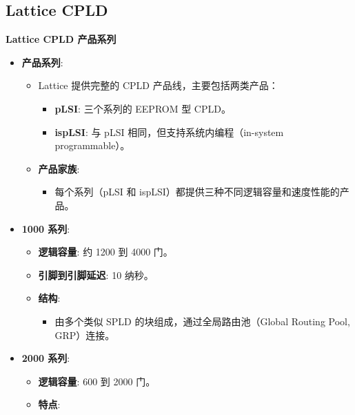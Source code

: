 \subsection{Lattice CPLD}
\begin{frame}[allowframebreaks]{\textbf{Lattice CPLD 产品系列}}
\begin{itemize}
\tightlist
\item
    \textbf{产品系列}:

    \begin{itemize}
    \tightlist
    \item
    Lattice 提供完整的 CPLD 产品线，主要包括两类产品：

    \begin{itemize}
    \tightlist
    \item
        \textbf{pLSI}: 三个系列的 EEPROM 型 CPLD。
    \item
        \textbf{ispLSI}: 与 pLSI 相同，但支持系统内编程（in-system
        programmable）。
    \end{itemize}
    \item
    \textbf{产品家族}:

    \begin{itemize}
    \tightlist
    \item
        每个系列（pLSI 和 ispLSI）都提供三种不同逻辑容量和速度性能的产品。
    \end{itemize}
    \end{itemize}
\item
    \textbf{1000 系列}:

    \begin{itemize}
    \tightlist
    \item
    \textbf{逻辑容量}: 约 1200 到 4000 门。
    \item
    \textbf{引脚到引脚延迟}: 10 纳秒。
    \item
    \textbf{结构}:

    \begin{itemize}
    \tightlist
    \item
        由多个类似 SPLD 的块组成，通过全局路由池（Global Routing Pool,
        GRP）连接。
    \end{itemize}
    \end{itemize}
\item
    \textbf{2000 系列}:

    \begin{itemize}
    \tightlist
    \item
    \textbf{逻辑容量}: 600 到 2000 门。
    \item
    \textbf{特点}:


\end{itemize}
\end{itemize}
\end{frame}
